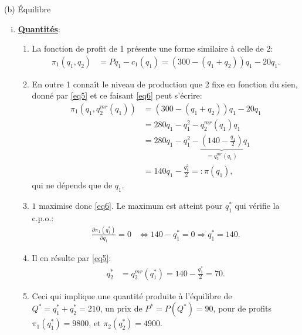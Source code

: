 \begin{frame}[allowframebreaks]{(b) Équilibre}
    \begin{enumerate}[(i)]
        \item \textbf{\underline{Quantités}}: 
        \begin{enumerate}[-]
            \item La fonction de profit de 1 présente une forme similaire à celle de 2:
            \begin{align}
                \pi_1\left(q_1, q_2\right) &= Pq_1 - c_1(q_1) = \left(300-(q_1+q_2)\right)q_1 - 20q_1.
                \label{eq6}
            \end{align}
            \item En outre 1 connaît le niveau de production que 2 fixe en fonction du sien, 
            donné par \eqref{eq5} et ce faisant \eqref{eq6} peut s'écrire:
            \begin{align}
                \pi_1\left(q_1, q^{mr}_2(q_1)\right) &= \left(300-(q_1+q_2)\right)q_1 - 20q_1 \nonumber\\
                &= 280q_1 - q_1^2 - q^{mr}_2(q_1)q_1 \nonumber \\
                &= 280q_1 - q_1^2 - \underbrace{\left(140 - \frac{q_1}{2}\right)}_{=q^{mr}_2(q_1)}q_1\nonumber\\
                &= 140 q_1 - \frac{q_1^2}{2} =: \pi(q_1),
                \label{eq6}
            \end{align}
            qui ne dépends que de $q_1$. 
            \item $1$ maximise donc \eqref{eq6}. Le maximum est atteint pour $q_1^*$ qui vérifie la c.p.o.:  
            \begin{align}
                \frac{\partial \pi_1(q_1^*)}{\partial q_1} =0 & \Leftrightarrow 
                140 - q_1^* =0 \Rightarrow q_1^* = 140.
                \label{eq7}
            \end{align}
            \item Il en résulte par \eqref{eq5}:
            \begin{align*}
                q^*_2 &= q^{mr}_2(q_1^*) = 140 - \frac{q_1^*}{2}=70.
            \end{align*}
            \item Ceci qui implique une quantité produite à l'équilibre de $Q^* = q_1^* + q_2^* = 210$, 
            un prix de $P^* = P(Q^*) = 90$, pour de profits $\pi_1(q_1^*) = 9800$, et 
            $\pi_2(q_2^*) = 4900$.
        \end{enumerate}
    \end{enumerate}
\end{frame}

